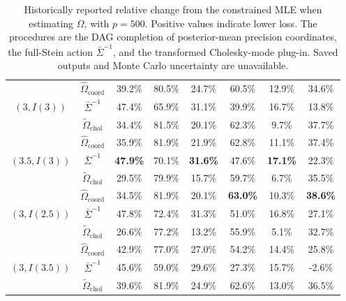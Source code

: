 \documentclass[12pt]{article}
\theoremstyle{plain}
\theoremstyle{definition}
\theoremstyle{remark}
\begin{document}
\begin{table}[htbp]
\begin{center}
\begin{tabular}{ |c|c|cc|cc|cc| }
\multirow{3}{*}{$(3,I(3))$} &$\widehat{\Omega}_{\mathrm{coord}}$          & 39.2\% & 80.5\%  & 24.7\% & 60.5\% & 12.9\% & 34.6\% \\
                                              & $\bar\Sigma^{-1}$& 47.4\% & 65.9\%  & 31.1\% & 39.9\% & 16.7\% & 13.8\%\\
                                              & $\widetilde{\Omega}_{\mathrm{chol}}$        & 34.4\% & 81.5\% & 20.1\% & 62.3\% & 9.7\% & 37.7\%\\
\hline
\multirow{3}{*}{$(3.5,I(3))$} &$\widehat{\Omega}_{\mathrm{coord}}$            & 35.9\% & 81.9\% & 21.9\% & 62.8\%  & 11.1\% & 37.4\% \\
                                              & $\bar\Sigma^{-1}$     & {\bf 47.9\%} & 70.1\%  & {\bf 31.6\%} & 47.6\%  & {\bf 17.1\%} & 22.3\%\\
                                              & $\widetilde{\Omega}_{\mathrm{chol}}$             & 29.5\% & 79.9\%  & 15.7\% & 59.7\%  &    6.7\%   & 35.5\%\\
  \hline
  \multirow{3}{*}{$(3,I(2.5))$} &$\widehat{\Omega}_{\mathrm{coord}}$          & 34.5\% & 81.9\% & 20.1\% & {\bf 63.0\%} & 10.3\% & {\bf38.6\%} \\
                                                   & $\bar\Sigma^{-1}$& 47.8\% & 72.4\% & 31.3\% & 51.0\%   &16.8\% & 27.1\%\\
                                                   & $\widetilde{\Omega}_{\mathrm{chol}}$        & 26.6\% & 77.2\% & 13.2\% & 55.9\% & 5.1\% & 32.7\%\\
  \hline
  \multirow{3}{*}{$(3,I(3.5))$} &$\widehat{\Omega}_{\mathrm{coord}}$          & 42.9\% & 77.0\% & 27.0\% & 54.2\% & 14.4\% & 25.8\% \\
                                                   & $\bar\Sigma^{-1}$& 45.6\% & 59.0\% & 29.6\% & 27.3\% &15.7\% & -2.6\%\\
                                                   & $\widetilde{\Omega}_{\mathrm{chol}}$        & 39.6\% & 81.9\% & 24.9\% & 62.6\% & 13.0\% & 36.5\%\\
 \hline
\end{tabular}
\end{center}
\caption{Historically reported relative change from the constrained MLE
when estimating \(\Omega\), with \(p=500\).  Positive values indicate
lower loss.  The procedures are the DAG completion of posterior-mean
precision coordinates, the full-Stein action \(\bar\Sigma^{-1}\), and
the transformed Cholesky-mode plug-in.  Saved outputs and Monte Carlo
uncertainty are unavailable.}
\label{tab:Estimation-p500-Precision-detail}
\end{table}
\end{document}
